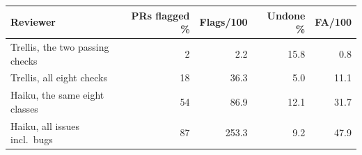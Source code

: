 \begin{tabular}{lrrrr}\toprule
Reviewer & PRs flagged \% & Flags/100 & Undone \% & FA/100 \\\midrule
Trellis, the two passing checks & 2 & 2.2 & 15.8 & 0.8 \\
Trellis, all eight checks & 18 & 36.3 & 5.0 & 11.1 \\
Haiku, the same eight classes & 54 & 86.9 & 12.1 & 31.7 \\
Haiku, all issues incl.\ bugs & 87 & 253.3 & 9.2 & 47.9 \\
\bottomrule\end{tabular}
